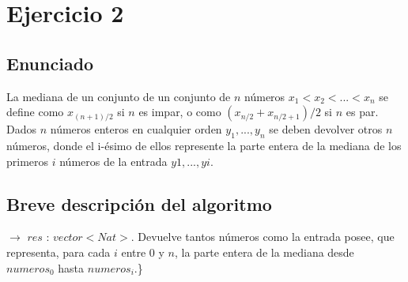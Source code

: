 \documentclass[a4paper, 10pt]{article}
\begin{document}
\newpage
\section{Ejercicio 2}

\subsection{Enunciado}

La mediana de un conjunto de un conjunto de $n$ números $x_1 < x_2 < ... < x_n$ se define como $x_{(n+1)/2}$ si $n$ es impar,
o como $(x_{n/2} + x_{n/2+1} )/2$ si $n$ es par. Dados $n$ números enteros en cualquier orden $y_1 , ..., y_n$ se deben
devolver otros $n$ números, donde el i-ésimo de ellos represente la parte entera de la mediana de los primeros $i$ números de
la entrada $y1, ..., yi$.

\subsection{Breve descripción del algoritmo}

 $\rightarrow$ $res$ : $vector<Nat>$.
Devuelve tantos números como la entrada posee, que representa, para cada $i$ entre 0 y $n$, la parte entera de la mediana
desde $numeros_0$ hasta $numeros_i$.\} \\
\end{document}
